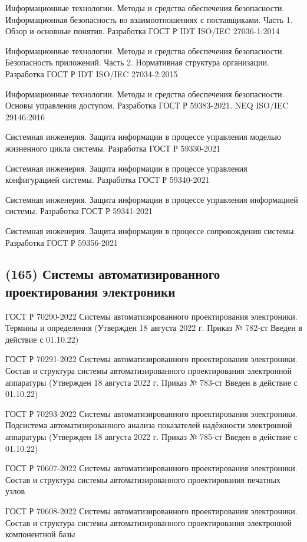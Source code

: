 Информационные технологии. Методы и средства обеспечения безопасности. Информационная безопасность во взаимоотношениях с поставщиками. Часть 1. Обзор и основные понятия. Разработка ГОСТ Р IDT ISO/IEC 27036-1:2014

Информационные технологии. Методы и средства обеспечения безопасности. Безопасность приложений. Часть 2. Нормативная структура организации. Разработка ГОСТ Р IDT ISO/IEC 27034-2:2015

Информационные технологии. Методы и средства обеспечения безопасности. Основы управления доступом. Разработка ГОСТ Р 59383-2021. NEQ ISO/IEC 29146:2016

Системная инженерия. Защита информации в процессе управления моделью жизненного цикла системы. Разработка ГОСТ Р 59330-2021

Системная инженерия. Защита информации в процессе управления конфигурацией системы. Разработка ГОСТ Р 59340-2021

Системная инженерия. Защита информации в процессе управления информацией системы. Разработка ГОСТ Р 59341-2021

Системная инженерия. Защита информации в процессе сопровождения системы. Разработка ГОСТ Р 59356-2021

\subsection{(165) Системы автоматизированного проектирования электроники}

ГОСТ Р 70290-2022 Системы автоматизированного проектирования электроники. Термины и определения (Утвержден 18 августа 2022 г.  Приказ № 782-ст Введен в действие с 01.10.22)

ГОСТ Р 70291-2022 Системы автоматизированного проектирования электроники. Состав и структура системы автоматизированного проектирования электронной аппаратуры (Утвержден 18 августа 2022 г.  Приказ № 783-ст Введен в действие с 01.10.22)

 ГОСТ Р 70293-2022 Системы автоматизированного проектирования электроники. Подсистема автоматизированного анализа показателей надёжности электронной аппаратуры (Утвержден 18 августа 2022 г.  Приказ № 785-ст Введен в действие с 01.10.22)

ГОСТ Р 70607-2022 Системы автоматизированного проектирования электроники. Состав и структура системы автоматизированного проектирования печатных узлов

ГОСТ Р 70608-2022 Системы автоматизированного проектирования электроники. Состав и структура системы автоматизированного проектирования электронной компонентной базы

